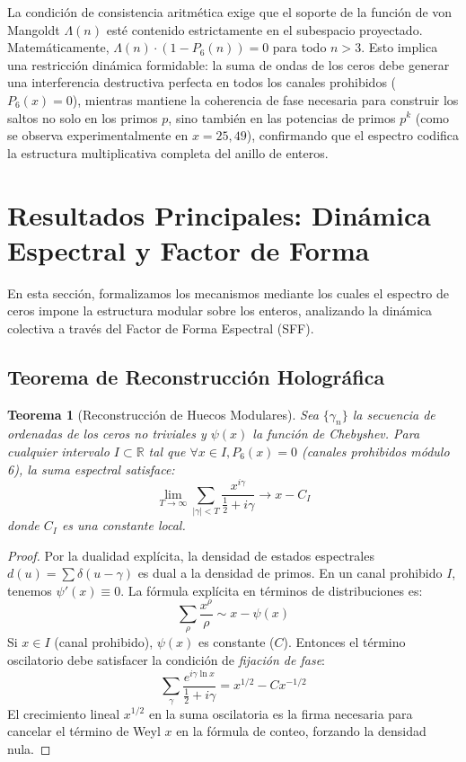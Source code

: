 \documentclass[12pt, a4paper]{article}
\theoremstyle{plain}
\newtheorem{teorema}{Teorema}[section]
\theoremstyle{definition}
\newcommand{\R}{\mathbb{R}}
\begin{document}
La condición de consistencia aritmética exige que el soporte de la función de von Mangoldt $\Lambda(n)$ esté contenido estrictamente en el subespacio proyectado. Matemáticamente, $\Lambda(n) \cdot (1 - P_6(n)) = 0$ para todo $n > 3$. Esto implica una restricción dinámica formidable: la suma de ondas de los ceros debe generar una interferencia destructiva perfecta en todos los canales prohibidos ($P_6(x) = 0$), mientras mantiene la coherencia de fase necesaria para construir los saltos no solo en los primos $p$, sino también en las potencias de primos $p^k$ (como se observa experimentalmente en $x=25, 49$), confirmando que el espectro codifica la estructura multiplicativa completa del anillo de enteros.

\section{Resultados Principales: Dinámica Espectral y Factor de Forma}

En esta sección, formalizamos los mecanismos mediante los cuales el espectro de ceros impone la estructura modular sobre los enteros, analizando la dinámica colectiva a través del Factor de Forma Espectral (SFF).

\subsection{Teorema de Reconstrucción Holográfica}

\begin{teorema}[Reconstrucción de Huecos Modulares]
Sea $\{\gamma_n\}$ la secuencia de ordenadas de los ceros no triviales y $\psi(x)$ la función de Chebyshev. Para cualquier intervalo $I \subset \R$ tal que $\forall x \in I, P_6(x) = 0$ (canales prohibidos módulo 6), la suma espectral satisface:
\begin{equation}
    \lim_{T \to \infty} \sum_{|\gamma| < T} \frac{x^{i\gamma}}{\frac{1}{2} + i\gamma} \to x - C_I
\end{equation}
donde $C_I$ es una constante local.
\end{teorema}

\begin{proof}
Por la dualidad explícita, la densidad de estados espectrales $d(u) = \sum \delta(u - \gamma)$ es dual a la densidad de primos. En un canal prohibido $I$, tenemos $\psi'(x) \equiv 0$.
La fórmula explícita en términos de distribuciones es:
\[ \sum_{\rho} \frac{x^\rho}{\rho} \sim x - \psi(x) \]
Si $x \in I$ (canal prohibido), $\psi(x)$ es constante ($C$). Entonces el término oscilatorio debe satisfacer la condición de \emph{fijación de fase}:
\[ \sum_{\gamma} \frac{e^{i\gamma \ln x}}{\frac{1}{2}+i\gamma} = x^{1/2} - C x^{-1/2} \]
El crecimiento lineal $x^{1/2}$ en la suma oscilatoria es la firma necesaria para cancelar el término de Weyl $x$ en la fórmula de conteo, forzando la densidad nula.
\end{proof}
\end{document}
